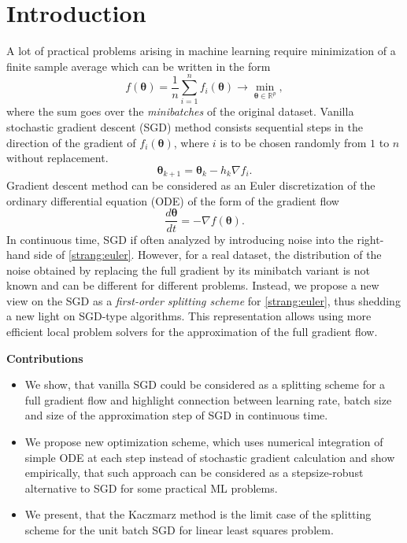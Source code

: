 \documentclass{article}
\newcommand{\vect}[1]{\boldsymbol{\mathbf{#1}}}
\begin{document}
\section{Introduction}
A lot of practical problems arising in machine learning require minimization of a finite sample average which can be written in the form
\begin{equation}\label{strang:finitesum}
    f(\vect{\vect{\theta}}) = \frac{1}{n} \sum_{i=1}^n f_i(\vect{\vect{\theta}}) \rightarrow \min_{\vect{\vect{\theta}} \in \mathbb{R}^p},
\end{equation}
where the sum goes over the \emph{minibatches} of the original dataset. Vanilla stochastic gradient descent
(SGD) method \cite{robbins1951stochastic} consists sequential steps in the direction of the gradient of $f_i(\vect{\theta})$, where $i$ is to be chosen randomly from $1$ to $n$ without replacement.
\begin{equation}
\vect{\theta}_{k+1} = \vect{\theta}_{k} - h_{k} \nabla f_i.
\end{equation}
Gradient descent method \cite{cauchy1847methode} can be considered as an Euler discretization of the ordinary
differential equation (ODE) of the form of the gradient flow
\begin{equation}\label{strang:euler}
    \frac{d \vect{\theta}}{d t} = -\nabla f(\vect{\theta}).
\end{equation}
In continuous time, SGD if often analyzed by introducing noise into the right-hand side of \eqref{strang:euler}. However, for a real dataset, the distribution of the noise obtained by replacing the full gradient by its minibatch variant is not known and can be different for different problems. Instead, we propose a new view on the SGD as a \emph{first-order splitting scheme} for \eqref{strang:euler}, thus shedding a new light on SGD-type algorithms. This representation allows using more efficient local problem solvers for the approximation of the full gradient flow.

\textbf{Contributions}
\begin{itemize}
    \item We show, that vanilla SGD could be considered as a splitting scheme for a full gradient flow and highlight connection between learning rate, batch size and size of the approximation step of SGD in continuous time.
    \item  We propose new optimization scheme, which uses numerical integration of simple ODE at each step instead of stochastic gradient calculation and show empirically, that such approach can be considered as a stepsize-robust alternative to SGD for some practical ML problems.
    \item We present, that the Kaczmarz method is the limit case of the splitting scheme for the unit batch SGD for linear least squares problem.
\end{itemize}
\end{document}
